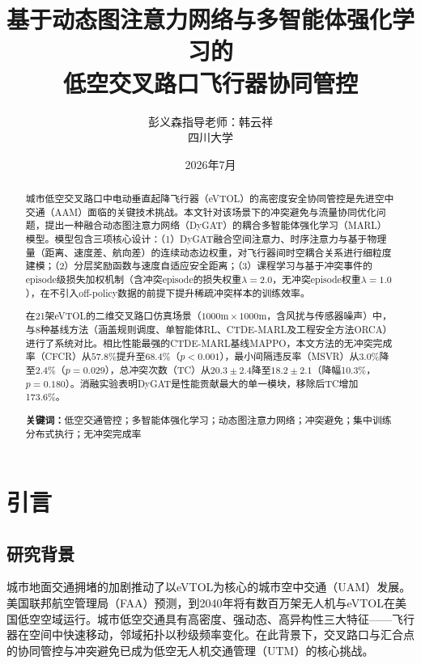 \documentclass[12pt,a4paper,UTF8]{ctexart}
\title{\textbf{基于动态图注意力网络与多智能体强化学习的\\低空交叉路口飞行器协同管控}}
\author{彭义森\quad 指导老师：韩云祥\\[4pt]\small 四川大学}
\date{2026年7月}
\begin{document}
\maketitle

\begin{abstract}
城市低空交叉路口中电动垂直起降飞行器（eVTOL）的高密度安全协同管控是先进空中交通（AAM）面临的关键技术挑战。本文针对该场景下的冲突避免与流量协同优化问题，提出一种融合动态图注意力网络（DyGAT）的耦合多智能体强化学习（MARL）模型。模型包含三项核心设计：（1）DyGAT融合空间注意力、时序注意力与基于物理量（距离、速度差、航向差）的连续动态边权重，对飞行器间时空耦合关系进行细粒度建模；（2）分层奖励函数与速度自适应安全距离；（3）课程学习与基于冲突事件的episode级损失加权机制（含冲突episode的损失权重$\lambda=2.0$，无冲突episode权重$\lambda=1.0$），在不引入off-policy数据的前提下提升稀疏冲突样本的训练效率。

在21架eVTOL的二维交叉路口仿真场景（$1000\text{m}\times1000\text{m}$，含风扰与传感器噪声）中，与8种基线方法（涵盖规则调度、单智能体RL、CTDE-MARL及工程安全方法ORCA）进行了系统对比。相比性能最强的CTDE-MARL基线MAPPO，本文方法的无冲突完成率（CFCR）从$57.8\%$提升至$68.4\%$（$p<0.001$），最小间隔违反率（MSVR）从$3.0\%$降至$2.4\%$（$p=0.029$），总冲突次数（TC）从$20.3\pm2.4$降至$18.2\pm2.1$（降幅10.3\%，$p=0.180$）。消融实验表明DyGAT是性能贡献最大的单一模块，移除后TC增加173.6\%。

\noindent\textbf{关键词：}低空交通管控；多智能体强化学习；动态图注意力网络；冲突避免；集中训练分布式执行；无冲突完成率
\end{abstract}

\section{引言}

\subsection{研究背景}

城市地面交通拥堵的加剧推动了以eVTOL为核心的城市空中交通（UAM）发展。美国联邦航空管理局（FAA）预测，到2040年将有数百万架无人机与eVTOL在美国低空空域运行\cite{ref1}。城市低空交通具有高密度、强动态、高异构性三大特征——飞行器在空间中快速移动，邻域拓扑以秒级频率变化。在此背景下，交叉路口与汇合点的协同管控与冲突避免已成为低空无人机交通管理（UTM）的核心挑战。
\end{document}
